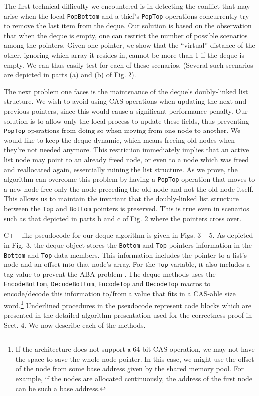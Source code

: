 The first technical difficulty we encountered is in detecting the
conflict that may arise when the local \lstinline!PopBottom! and a
thief's \lstinline!PopTop! operations concurrently try to remove the
last item from the deque. Our solution is based on the observation
that when the deque is empty, one can restrict the number of possible
scenarios among the pointers. Given one pointer, we show that the
``virtual'' distance of the other, ignoring which array it resides in,
cannot be more than 1 if the deque is empty. We can thus easily test
for each of these scenarios. (Several such scenarios are depicted in
parts (a) and (b) of Fig. 2).

The next problem one faces is the maintenance of the deque's
doubly-linked list structure. We wish to avoid using CAS operations
when updating the next and previous pointers, since this would cause a
significant performance penalty. Our solution is to allow only the
local process to update these fields, thus preventing
\lstinline!PopTop! operations from doing so when moving from one node
to another. We would like to keep the deque dynamic, which means
freeing old nodes when they're not needed anymore. This restriction
immediately implies that an active list node may point to an already
freed node, or even to a node which was freed and reallocated again,
essentially ruining the list structure. As we prove, the algorithm can
overcome this problem by having a \lstinline!PopTop! operation that
moves to a new node free only the node preceding the old node and not
the old node itself. This allows us to maintain the invariant that the
doubly-linked list structure between the \lstinline!Top! and
\lstinline!Bottom! pointers is preserved. This is true even in
scenarios such as that depicted in parts b and c of Fig. 2 where the
pointers cross over.


C++-like pseudocode for our deque algorithm is given in Figs. 3 --
5. As depicted in Fig. 3, the deque object stores the
\lstinline!Bottom! and \lstinline!Top! pointers information in the
\lstinline!Bottom! and \lstinline!Top! data members. This information
includes the pointer to a list's node and an offset into that node's
array. For the \lstinline!Top! variable, it also includes a tag value
to prevent the ABA problem \cite{Dechev2006}. The deque methods uses
the \lstinline!EncodeBottom!, \lstinline!DecodeBottom!,
\lstinline!EncodeTop! and \lstinline!DecodeTop! macros to
encode/decode this information to/from a value that fits in a CAS-able
size word.\footnote{If the architecture does not support a 64-bit CAS
  operation, we may not have the space to save the whole node
  pointer. In this case, we might use the offset of the node from some
  base address given by the shared memory pool. For example, if the
  nodes are allocated continuously, the address of the first node can
  be such a base address.} Underlined procedures in the pseudocode
represent code blocks which are presented in the detailed algorithm
presentation used for the correctness proof in Sect. 4. We now
describe each of the methods.

